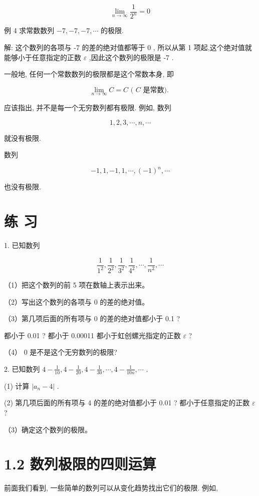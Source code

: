 \documentclass[10pt]{article}
\begin{document}
\[
\mathop{\lim }\limits_{{n \rightarrow \infty }}\frac{1}{{2}^{n}} = 0
\]

例 4 求常数数列 \(- 7, - 7, - 7,\cdots\) 的极限.

解: 这个数列的各项与 -7 的差的绝对值都等于 0 , 所以从第 1 项起,这个绝对值就能够小于任意指定的正数 \(\varepsilon\) ,因此这个数列的极限是 -7 .

一般地, 任何一个常数数列的极限都是这个常数本身, 即

\[
\mathop{\lim }\limits_{{n \rightarrow \infty }}C = C\text{ ( }C\text{ 是常数). }
\]

应该指出, 并不是每一个无穷数列都有极限. 例如, 数列

\[
1,2,3,\cdots ,n,\cdots
\]

就没有极限.

数列

\[
- 1,1, - 1,1,\cdots ,{\left( -1\right) }^{n},\cdots
\]

也没有极限.

\section*{练 习}

1. 已知数列

\[
\frac{1}{{1}^{2}},\frac{1}{{2}^{2}},\frac{1}{{3}^{2}},\frac{1}{{4}^{2}},\cdots ,\frac{1}{{n}^{2}},\cdots
\]

（1）把这个数列的前 5 项在数轴上表示出来。

（2）写出这个数列的各项与 0 的差的绝对值。

（3）第几项后面的所有项与 0 的差的绝对值都小于 0.1 ?

都小于 0.01 ? 都小于 0.00011 都小于虹创螺光指定的正数 \(\varepsilon\) ?

（4） 0 是不是这个无穷数列的极限?

2. 已知数列 \(4 - \frac{1}{10},4 - \frac{1}{20},4 - \frac{1}{30},\cdots ,4 - \frac{1}{10n},\cdots\) .

(1) 计算 \(\left| {{a}_{n} - 4}\right|\) .

(2) 第几项后面的所有项与 4 的差的绝对值都小于 0.01 ? 都小于任意指定的正数 \(\varepsilon\) ?

（3）确定这个数列的极限。

\section*{1.2 数列极限的四则运算}

前面我们看到, 一些简单的数列可以从变化趋势找出它们的极限. 例如,
\end{document}
